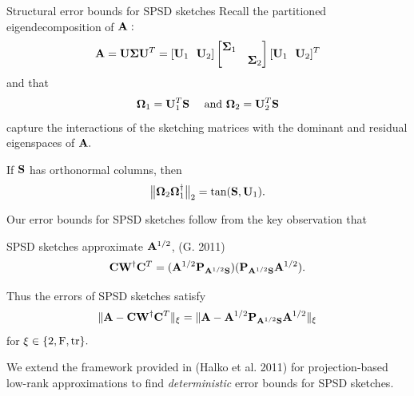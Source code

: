 \documentclass[xcolor=x11names,compress,ignorenonframetext]{beamer}
\renewcommand{\(}{\begin{columns}}
\renewcommand{\)}{\end{columns}}
\newcommand{\<}[1]{\begin{column}{#1}}
\renewcommand{\>}{\end{column}}
\def\refcolor{DodgerBlue4}
\newcommand{\refer}[1]{({\color{\refcolor}#1})}
\begin{document}
\begin{frame}{Structural error bounds for SPSD sketches}
 Recall the partitioned eigendecomposition of $\mathbf{A}:$
  \[ \mathbf{A} = \mathbf{U} \boldsymbol{\Sigma} \mathbf{U}^T = [\mathbf{U}_1 \ \ \mathbf{U}_2] 
  \left[\begin{matrix} \boldsymbol{\Sigma}_1 & \\ & \boldsymbol{\Sigma}_2 \end{matrix} \right] 
  [\mathbf{U}_1 \ \ \mathbf{U}_2]^T
  \]
  and that
 \[
  \boldsymbol{\Omega}_1 = \mathbf{U}_1^T \mathbf{S} \quad \text{ and } \boldsymbol{\Omega}_2 = \mathbf{U}_2^T \mathbf{S}
 \]
 capture the interactions of the sketching matrices with the dominant and residual eigenspaces of $\mathbf{A}.$
 \vspace{1em}
 
 If $\mathbf{S}$ has orthonormal columns, then
 \[
  \big\|\boldsymbol{\Omega}_2 \boldsymbol{\Omega}_1^\dagger\big\|_2 = \tan(\mathbf{S}, \mathbf{U}_1).
 \]

\end{frame}

\begin{frame}
 Our error bounds for SPSD sketches follow from the key observation that 
 \begin{block}{SPSD sketches approximate $\mathbf{A}^{1/2}$, \refer{G. 2011}}
  \[
   \mathbf{C}\mathbf{W}^\dagger \mathbf{C}^T = (\mathbf{A}^{1/2} \mathbf{P}_{\mathbf{A}^{1/2} \mathbf{S}}) (\mathbf{P}_{\mathbf{A}^{1/2} \mathbf{S}} \mathbf{A}^{1/2}).
  \]
 \end{block}
 Thus the errors of SPSD sketches satisfy
 \[
  \|\mathbf{A} - \mathbf{C}\mathbf{W}^\dagger \mathbf{C}^T\|_\xi =
   \|\mathbf{A} - \mathbf{A}^{1/2} \mathbf{P}_{\mathbf{A}^{1/2} \mathbf{S}} \mathbf{A}^{1/2}\|_\xi
 \]
 for $\xi \in \{2, \mathrm{F}, \text{tr}\}.$
 \vspace{0.7em}
 
 We extend the framework provided in \refer{Halko et al. 2011} for projection-based low-rank approximations
 to find \emph{deterministic} error bounds 
 for SPSD sketches.
\end{frame}
\end{document}
